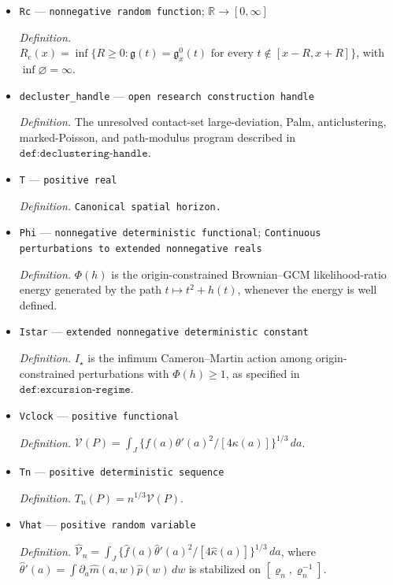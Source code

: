 \documentclass{article}
\begin{document}
\begin{itemize}
  \item \texttt{Rc} --- \texttt{nonnegative random function}; \(\mathbb R\to[0,\infty]\)
  \par\smallskip\noindent\emph{Definition.} \(R_{\mathrm c}(x)=\inf\{R\ge0:\mathfrak g(t)=\mathfrak g_x^0(t)\text{ for every }t\notin[x-R,x+R]\}\), with \(\inf\varnothing=\infty\).
  \item \texttt{decluster\_\allowbreak{}handle} --- \texttt{open research construction handle}
  \par\smallskip\noindent\emph{Definition.} The unresolved contact-set large-deviation, Palm, anticlustering, marked-Poisson, and path-modulus program described in \(\texttt{def:declustering-handle}\).
  \item \texttt{T} --- \texttt{positive real}
  \par\smallskip\noindent\emph{Definition.} \texttt{Canonical spatial horizon.}
  \item \texttt{Phi} --- \texttt{nonnegative deterministic functional}; \texttt{Continuous perturbations to extended nonnegative reals}
  \par\smallskip\noindent\emph{Definition.} \(\Phi(h)\) is the origin-constrained Brownian--GCM likelihood-ratio energy generated by the path \(t\mapsto t^2+h(t)\), whenever the energy is well defined.
  \item \texttt{Istar} --- \texttt{extended nonnegative deterministic constant}
  \par\smallskip\noindent\emph{Definition.} \(I_\star\) is the infimum Cameron--Martin action among origin-constrained perturbations with \(\Phi(h)\ge1\), as specified in \(\texttt{def:excursion-regime}\).
  \item \texttt{Vclock} --- \texttt{positive functional}
  \par\smallskip\noindent\emph{Definition.} \(\mathcal V(P)=\int_J\{f(a)\theta'(a)^2/[4\kappa(a)]\}^{1/3}\,da\).
  \item \texttt{Tn} --- \texttt{positive deterministic sequence}
  \par\smallskip\noindent\emph{Definition.} \(T_n(P)=n^{1/3}\mathcal V(P)\).
  \item \texttt{Vhat} --- \texttt{positive random variable}
  \par\smallskip\noindent\emph{Definition.} \(\widehat{\mathcal V}_n=\int_J\{\widehat f(a)\widehat\theta'(a)^2/[4\widehat\kappa(a)]\}^{1/3}\,da\), where \(\widehat\theta'(a)=\int\partial_a\widehat m(a,w)\widehat p(w)\,dw\) is stabilized on \([\varrho_n,\varrho_n^{-1}]\).

\end{itemize}
\end{document}
